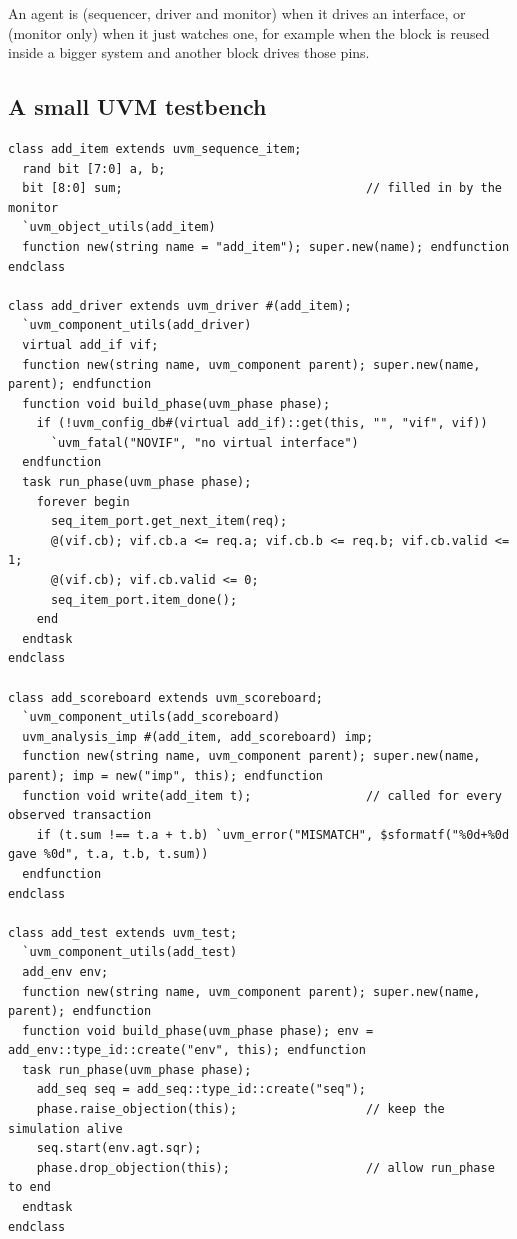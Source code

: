 An agent is  (sequencer, driver and monitor) when it drives an interface, or  (monitor only) when it just watches one, for example when the block is reused inside a bigger system and another block drives those pins.

\subsection*{A small UVM testbench}

\begin{lstlisting}
class add_item extends uvm_sequence_item;
  rand bit [7:0] a, b;
  bit [8:0] sum;                                  // filled in by the monitor
  `uvm_object_utils(add_item)
  function new(string name = "add_item"); super.new(name); endfunction
endclass

class add_driver extends uvm_driver #(add_item);
  `uvm_component_utils(add_driver)
  virtual add_if vif;
  function new(string name, uvm_component parent); super.new(name, parent); endfunction
  function void build_phase(uvm_phase phase);
    if (!uvm_config_db#(virtual add_if)::get(this, "", "vif", vif))
      `uvm_fatal("NOVIF", "no virtual interface")
  endfunction
  task run_phase(uvm_phase phase);
    forever begin
      seq_item_port.get_next_item(req);
      @(vif.cb); vif.cb.a <= req.a; vif.cb.b <= req.b; vif.cb.valid <= 1;
      @(vif.cb); vif.cb.valid <= 0;
      seq_item_port.item_done();
    end
  endtask
endclass

class add_scoreboard extends uvm_scoreboard;
  `uvm_component_utils(add_scoreboard)
  uvm_analysis_imp #(add_item, add_scoreboard) imp;
  function new(string name, uvm_component parent); super.new(name, parent); imp = new("imp", this); endfunction
  function void write(add_item t);                // called for every observed transaction
    if (t.sum !== t.a + t.b) `uvm_error("MISMATCH", $sformatf("%0d+%0d gave %0d", t.a, t.b, t.sum))
  endfunction
endclass

class add_test extends uvm_test;
  `uvm_component_utils(add_test)
  add_env env;
  function new(string name, uvm_component parent); super.new(name, parent); endfunction
  function void build_phase(uvm_phase phase); env = add_env::type_id::create("env", this); endfunction
  task run_phase(uvm_phase phase);
    add_seq seq = add_seq::type_id::create("seq");
    phase.raise_objection(this);                  // keep the simulation alive
    seq.start(env.agt.sqr);
    phase.drop_objection(this);                   // allow run_phase to end
  endtask
endclass
\end{lstlisting}


